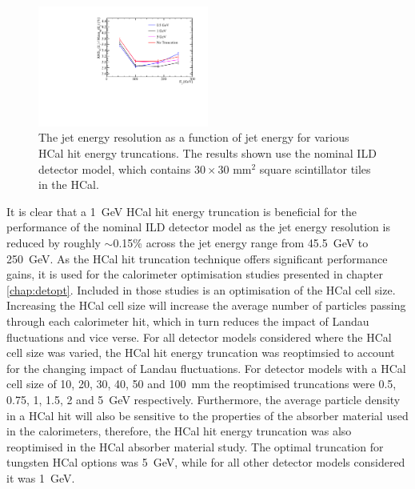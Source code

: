 \begin{figure}[h!]
\includegraphics[width=0.5\textwidth]{EnergyEstimators/Plots/CellTruncation/JER_vs_JetEnergy_HCalCellTruncation.pdf}
\caption[The jet energy resolution as a function of jet energy for various HCal hit energy truncations.  The results shown use the nominal ILD detector model, which contains $30\times30 \text{ mm}^{2}$ square scintillator tiles in the HCal.]{The jet energy resolution as a function of jet energy for various HCal hit energy truncations.  The results shown use the nominal ILD detector model, which contains $30\times30 \text{ mm}^{2}$ square scintillator tiles in the HCal.}
\label{fig:jercelltrunc}
\end{figure}

It is clear that a 1~GeV HCal hit energy truncation is beneficial for the performance of the nominal ILD detector model as the jet energy resolution is reduced by roughly $\sim$0.15\% across the jet energy range from 45.5~GeV to 250~GeV.  As the HCal hit truncation technique offers significant performance gains, it is used for the calorimeter optimisation studies presented in chapter \ref{chap:detopt}.  Included in those studies is an optimisation of the HCal cell size.  Increasing the HCal cell size will increase the average number of particles passing through each calorimeter hit, which in turn reduces the impact of Landau fluctuations and vice verse.  For all detector models considered where the HCal cell size was varied, the HCal hit energy truncation was reoptimsied to account for the changing impact of Landau fluctuations.  For detector models with a HCal cell size of 10, 20, 30, 40, 50 and 100~mm the reoptimised truncations were 0.5, 0.75, 1, 1.5, 2 and 5~GeV respectively.  Furthermore, the average particle density in a HCal hit will also be sensitive to the properties of the absorber material used in the calorimeters, therefore, the HCal hit energy truncation was also reoptimised in the HCal absorber material study.  The optimal truncation for tungsten HCal options was 5~GeV, while for all other detector models considered it was 1~GeV.

